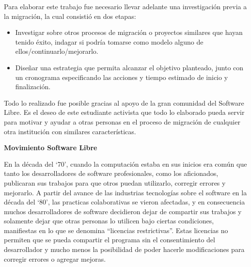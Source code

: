 	
	\vspace{0,5cm}
	        
	
	Para elaborar este trabajo fue necesario llevar adelante una investigación 
	previa a la migración, la cual consistió en dos etapas:\par
	
	
	\begin{itemize}
	
	
	    \item Investigar sobre otros procesos de migración o proyectos similares que hayan tenido éxito, indagar si podría tomarse como modelo alguno de ellos/continuarlo/mejorarlo.
	
	        
	    \item Diseñar una estrategia que permita alcanzar el objetivo planteado, junto con un cronograma especificando las acciones y tiempo estimado de inicio y finalización.
	        
	        
	\end{itemize}
	
	
	Todo lo realizado fue posible gracias al apoyo de la gran comunidad del Software Libre. Es el deseo de este estudiante activista que todo lo elaborado pueda servir para motivar y ayudar a otras personas en el proceso de migración de cualquier otra institución con similares características.\par
	
	\clearpage
	
	\begin{center}
	
	    \textbf{Movimiento Software Libre}
	    
	\end{center}
	
	
	\vspace{0.2cm}
	
	
	En la década del ‘70’, cuando la computación estaba en sus inicios era común que tanto los desarrolladores de software profesionales, como los	aficionados, publicaran sus trabajos para que otros puedan utilizarlo, corregir errores y mejorarlo. A partir del avance de las industrias tecnologías sobre el software en la década del ‘80’, las practicas 
	colaborativas se vieron afectadas,  y en consecuencia muchos desarrolladores de software decidieron dejar de compartir sus trabajos y solamente dejar que otras personas lo utilicen bajo ciertas condiciones, manifiestas en lo que se denomina “licencias restrictivas”. Estas 
	licencias no permiten que se pueda compartir el programa sin el consentimiento del desarrollador y mucho menos la posibilidad de poder hacerle modificaciones para corregir errores o agregar mejoras.\par
	
